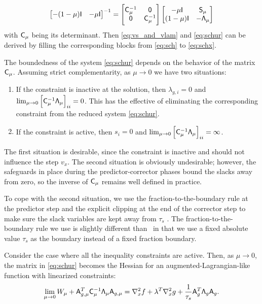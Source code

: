 \begin{remark}
\begin{equation*}
\begin{bmatrix}
 -(1-\mu)\mathsf{I} & -\mu \mathsf{I}  
\end{bmatrix}^{-1} 
= 
\begin{bmatrix}
  \mathsf{C}_\mu^{-1} & \mathsf{0} \\
    \mathsf{0} & \mathsf{C}_\mu^{-1}
  \end{bmatrix}
  \begin{bmatrix}
   -\mu \mathsf{I} & \mathsf{S}_\mu \\
    (1-\mu)\mathsf{I} & -\mathsf{\Lambda}_\mu 
  \end{bmatrix}
\end{equation*}
with $\mathsf{C}_\mu$ being its determinant. Then  \eqref{eq:vs_and_vlam} and 
\eqref{eq:schur} can be derived by filling the corresponding blocks from \eqref{eq:sch} 
to \eqref{eq:schx}.   
\end{remark}

The boundedness of the system \eqref{eq:schur} depends on the behavior of the
matrix $\mathsf{C}_{\mu}$.  Assuming strict complementarity, as $\mu\rightarrow 0$
we have two situations:
\begin{enumerate}
\item If the constraint is inactive at the solution, then $\lambda_{g,i} = 0$ and
  $\lim_{\mu\rightarrow 0} \left[\mathsf{C}_\mu^{-1} \mathsf{\Lambda}_\mu \right]_{ii}
  = 0$.  This has the effective of eliminating the corresponding constraint from
  the reduced system \eqref{eq:schur}.

\item If the constraint is active, then $s_i = 0$ and $\lim_{\mu\rightarrow 0}
  \left[\mathsf{C}_\mu^{-1} \mathsf{\Lambda}_\mu \right]_{ii} = \infty$.
\end{enumerate}
The first situation is desirable, since the constraint is inactive and should
not influence the step $v_x$.  The second situation is obviously undesirable;
however, the safeguards in place during the predictor-corrector phases bound the
slacks away from zero, so the inverse of $\mathsf{C}_{\mu}$ remains well defined in practice.

To cope with the second situation, we use the fraction-to-the-boundary rule 
at the predictor step and the explicit clipping at the end of the corrector step to make sure 
the slack variables are kept away from $\tau_s$ . 
The fraction-to-the-boundary rule we use is slightly 
different than~\cite{Nocedal2006NO} in that we use a fixed absolute value $\tau_s$ as the boundary 
instead of a fixed fraction boundary. 

\begin{remark}
  Consider the case where all the inequality constraints are active.  Then, as
  $\mu\rightarrow 0$, the matrix in \eqref{eq:schur} becomes the Hessian for an
  augmented-Lagrangian-like function with linearized constraints:
  \begin{equation*}
    \lim_{\mu\rightarrow 0} W_{\mu} + \mathsf{A}_{g,\mu}^T \mathsf{C}_{\mu}^{-1}
    \mathsf{\Lambda}_\mu \mathsf{A}_{g,\mu} = \nabla_x^{2} f + \lambda^T \nabla_x^2 g +
    \frac{1}{\tau_s}\mathsf{A}_g^{T} \mathsf{\Lambda}_g \mathsf{A}_g.
  \end{equation*}
\end{remark}


